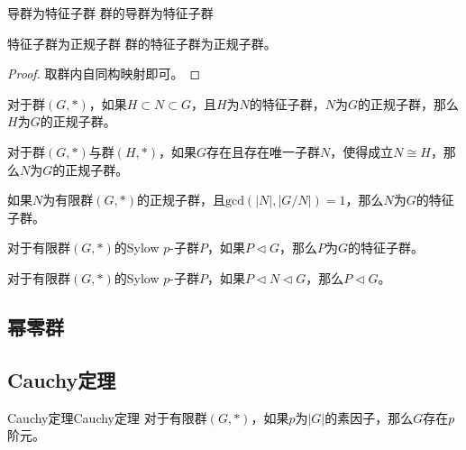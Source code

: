 \begin{definition}{导群为特征子群}
	群的导群为特征子群
\end{definition}

\begin{proposition}{特征子群为正规子群}
	群的特征子群为正规子群。
\end{proposition}

\begin{proof}
	取群内自同构映射即可。
\end{proof}

\begin{proposition}
	对于群$(G,*)$，如果$H\subset N\subset G$，且$H$为$N$的特征子群，$N$为$G$的正规子群，那么$H$为$G$的正规子群。
\end{proposition}

\begin{proposition}
	对于群$(G,*)$与群$(H,*)$，如果$G$存在且存在唯一子群$N$，使得成立$N\cong H$，那么$N$为$G$的正规子群。
\end{proposition}

\begin{proposition}
	如果$N$为有限群$(G,*)$的正规子群，且$\text{gcd}(|N|,|G/N|)=1$，那么$N$为$G$的特征子群。
\end{proposition}

\begin{proposition}
	对于有限群$(G,*)$的Sylow $p$-子群$P$，如果$P\lhd G$，那么$P$为$G$的特征子群。
\end{proposition}

\begin{proposition}
	对于有限群$(G,*)$的Sylow $p$-子群$P$，如果$P\lhd N\lhd G$，那么$P\lhd G$。
\end{proposition}

\subsection{幂零群}

\subsection{Cauchy定理}

\begin{theorem}{Cauchy定理}{Cauchy定理}
	对于有限群$(G,*)$，如果$p$为$|G|$的素因子，那么$G$存在$p$阶元。
\end{theorem}

